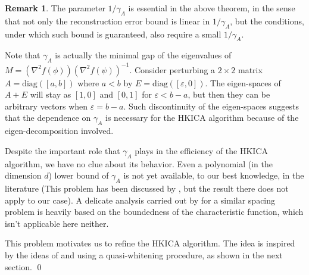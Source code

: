 \documentclass[twoside]{article}
\theoremstyle{definition}
\newtheorem{remark}[lemma]{Remark}
\newcommand{\eps}{\varepsilon}
\begin{document}
\fi
\begin{remark}
The parameter $1/\gamma_A$ is essential in the above theorem, in the sense that not only the reconstruction error bound is linear in $1/\gamma_A$, but the conditions, under which such bound is guaranteed, also require a small $1/\gamma_A$.

Note that $\gamma_A$ is actually the minimal gap of the eigenvalues of $M = (\nabla^2 f(\phi))(\nabla^2f(\psi))^{-1}$.
Consider perturbing a $2\times 2$ matrix $A = \text{diag}([a,b])$ where $a<b$ by $E = \text{diag}([\eps,0])$. 
The eigen-spaces of $A+E$ will stay as $[1,0]$ and $[0,1]$ for $\eps < b-a$, but then they can be arbitrary vectors when $\eps = b-a$.  
Such discontinuity of the eigen-spaces suggests that the dependence on $\gamma_A$ is necessary for the HKICA algorithm because of the eigen-decomposition involved. 

Despite the important role that $\gamma_A$ plays in the efficiency of the HKICA algorithm, we have no clue about its behavior. 
Even a polynomial (in the dimension $d$) lower bound of $\gamma_A$ is not yet available, to our best knowledge, in the literature (This problem has been discussed by \citet{husler1987minimal}, but the result there does not apply to our case).
A delicate analysis carried out by \citet{goyal2014fourier} for a similar spacing problem is heavily based on the boundedness of the characteristic function, which isn't applicable here neither. 

This problem motivates us to refine the HKICA algorithm.
The idea is inspired by the ideas of \citet{arora2012provable} and \citet{frieze1996learning} using a quasi-whitening procedure, as shown in the next section. \qed
\end{remark}
\end{document}
